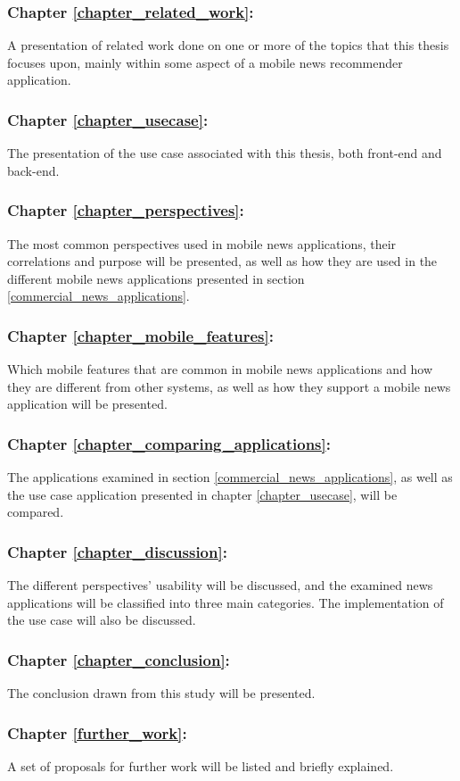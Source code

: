 \subsubsection{Chapter \ref{chapter_related_work}: }
A presentation of related work done on one or more of the topics that this thesis focuses upon, mainly within some aspect of a mobile news recommender application.


\subsubsection{Chapter \ref{chapter_usecase}: }
The presentation of the use case associated with this thesis, both front-end and back-end.


\subsubsection{Chapter \ref{chapter_perspectives}: }
The most common perspectives used in mobile news applications, their correlations and purpose will be presented, as well as how they are used in the different mobile news applications presented in section \ref{commercial_news_applications}.

\subsubsection{Chapter \ref{chapter_mobile_features}: }
Which mobile features that are common in mobile news applications and how they are different from other systems, as well as how they support a mobile news application will be presented.

\subsubsection{Chapter \ref{chapter_comparing_applications}: }
The applications examined in section \ref{commercial_news_applications}, as well as the use case application presented in chapter \ref{chapter_usecase}, will be compared.

\subsubsection{Chapter \ref{chapter_discussion}: }
The different perspectives' usability will be discussed, and the examined news applications will be classified into three main categories. The implementation of the use case will also be discussed.

\subsubsection{Chapter \ref{chapter_conclusion}: }
The conclusion drawn from this study will be presented.

\subsubsection{Chapter \ref{further_work}: }
A set of proposals for further work will be listed and briefly explained.
